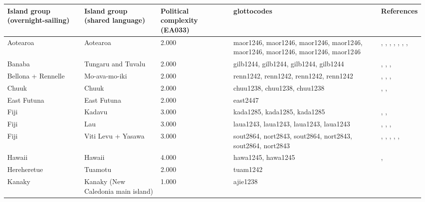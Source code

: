 \begin{longtable}{p{1.8cm}p{1.8cm}p{1.8cm}p{2cm}p{7cm}}
  \toprule
Island group (overnight-sailing) & Island group (shared language) & Political complexity (EA033) & glottocodes & References \\ 
  \midrule
Aotearoa & Aotearoa & 2.000 & maor1246, maor1246, maor1246, maor1246, maor1246, maor1246, maor1246, maor1246 & \citet{sahlins1958social}, \citet{sahlins1958social}, \citet{Buck PH (1952) The Coming of the Maori (Whitcombe and Tombs: Wellington, New Zealand).}, \citet{Buck PH (1952) The Coming of the Maori (Whitcombe and Tombs: Wellington, New Zealand).}, \citet{kirch1984evolution}, \citet{kirch1984evolution}, \citet{van1995maori}, \citet{van1995maori} \\ 
  Banaba & Tungaru and Tuvalu & 2.000 & gilb1244, gilb1244, gilb1244, gilb1244 & \citet{lambert1966}, \citet{lambert1975makin}, \citet{lambert1991}, \citet{macdonald1982cinderellas} \\ 
  Bellona + Rennelle & Mo-ava-mo-iki & 2.000 & renn1242, renn1242, renn1242, renn1242 & \citet{birketsmith1956}, \citet{birketsmith1956}, \citet{monberg1991bellona}, \citet{monberg1991bellona} \\ 
  Chuuk & Chuuk & 2.000 & chuu1238, chuu1238, chuu1238 & \citet{goodenough1991}, \citet{goodenough2002under}, \citet{mahony1960taro} \\ 
  East Futuna & East Futuna & 2.000 & east2447 & \citet{kirch1994wet} \\ 
  Fiji & Kadavu & 3.000 & kada1285, kada1285, kada1285 & \citet{kuhlken2002intensive}, \citet{scarr1984fiji}, \citet{walter1978examination} \\ 
  Fiji & Lau & 3.000 & laua1243, laua1243, laua1243, laua1243 & \citet{hocart_1929}, \citet{quain_1948}, \citet{thompson1940a}, \citet{thompson1940b} \\ 
  Fiji & Viti Levu + Yasawa & 3.000 & sout2864, nort2843, sout2864, nort2843, sout2864, nort2843 & \citet{kuhlken2002intensive}, \citet{kuhlken2002intensive}, \citet{scarr1984fiji}, \citet{scarr1984fiji}, \citet{walter1978examination}, \citet{walter1978examination} \\ 
  Hawaii & Hawaii & 4.000 & hawa1245, hawa1245 & \citet{kirch1994wet}, \citet{kirch2010chiefs} \\ 
  Hereheretue & Tuamotu & 2.000 & tuam1242 & \citet{emory1975material} \\ 
  Kanaky & Kanaky (New Caledonia main island) & 1.000 & ajie1238 & \citet{winslow1991} \\ 

\end{longtable}
